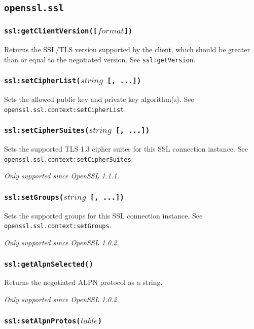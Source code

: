 \documentclass[11pt, oneside]{memoir}
\newcommand*{\fn}[1]{\texttt{#1}\xspace}
\newcounter{toccols}
\newenvironment{Module}[1]{
	\subsection{\texttt{#1}}
	\addtocontents{toc}{
		\protect\begin{multicols}{\value{toccols}}
	}
}{
	\addtocontents{toc}{\protect\end{multicols}}
}
\begin{document}
\begin{Module}{openssl.ssl}
\subsubsection[\fn{ssl:getClientVersion}]{\fn{ssl:getClientVersion([$format$])}}

Returns the SSL/TLS version supported by the client, which should be greater than or equal to the negotiated version. See \fn{ssl:getVersion}.

\subsubsection[\fn{ssl:setCipherList}]{\fn{ssl:setCipherList($string$ [, ...])}}

Sets the allowed public key and private key algorithm(s). See \fn{openssl.ssl.context:setCipherList}.

\subsubsection[\fn{ssl:setCipherSuites}]{\fn{ssl:setCipherSuites($string$ [, ...])}}

Sets the supported TLS 1.3 cipher suites for this SSL connection instance. See \fn{openssl.ssl.context:setCipherSuites}.

\emph{Only supported since OpenSSL 1.1.1.}

\subsubsection[\fn{ssl:setGroups}]{\fn{ssl:setGroups($string$ [, ...])}}

Sets the supported groups for this SSL connection instance. See \fn{openssl.ssl.context:setGroups}.

\emph{Only supported since OpenSSL 1.0.2.}

\subsubsection[\fn{ssl:getAlpnSelected}]{\fn{ssl:getAlpnSelected()}}

Returns the negotiated ALPN protocol as a string.

\emph{Only supported since OpenSSL 1.0.2.}

\subsubsection[\fn{ssl:setAlpnProtos}]{\fn{ssl:setAlpnProtos($table$)}}


\end{Module}
\end{document}
